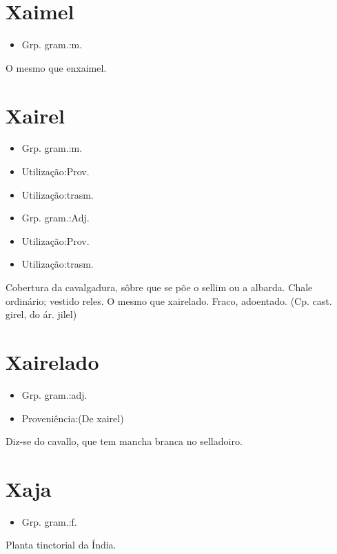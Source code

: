 \section{Xaimel}
\begin{itemize}
\item {Grp. gram.:m.}
\end{itemize}
O mesmo que \textunderscore enxaimel\textunderscore .
\section{Xairel}
\begin{itemize}
\item {Grp. gram.:m.}
\end{itemize}
\begin{itemize}
\item {Utilização:Prov.}
\end{itemize}
\begin{itemize}
\item {Utilização:trasm.}
\end{itemize}
\begin{itemize}
\item {Grp. gram.:Adj.}
\end{itemize}
\begin{itemize}
\item {Utilização:Prov.}
\end{itemize}
\begin{itemize}
\item {Utilização:trasm.}
\end{itemize}
Cobertura da cavalgadura, sôbre que se põe o sellim ou a albarda.
Chale ordinário; vestido reles.
O mesmo que \textunderscore xairelado\textunderscore .
Fraco, adoentado.
(Cp. cast. \textunderscore girel\textunderscore , do ár. \textunderscore jilel\textunderscore )
\section{Xairelado}
\begin{itemize}
\item {Grp. gram.:adj.}
\end{itemize}
\begin{itemize}
\item {Proveniência:(De \textunderscore xairel\textunderscore )}
\end{itemize}
Diz-se do cavallo, que tem mancha branca no selladoiro.
\section{Xaja}
\begin{itemize}
\item {Grp. gram.:f.}
\end{itemize}
Planta tinctorial da Índia.
